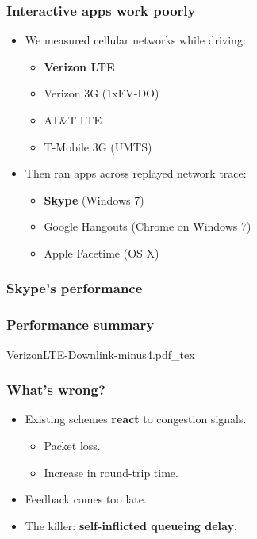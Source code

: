 \documentclass[svgnames]{beamer}
\begin{document}
\begin{frame}
\frametitle{Interactive apps work poorly}

\begin{itemize}
\item We measured cellular networks while driving:

\begin{itemize}
\item {\color{red}\bf Verizon LTE}
\item Verizon 3G (1xEV-DO)
\item AT\&T LTE
\item T-Mobile 3G (UMTS)
\end{itemize}

\item Then ran apps across replayed network trace:

\begin{itemize}
\item {\color{red}\bf Skype} (Windows 7)
\item Google Hangouts (Chrome on Windows 7)
\item Apple Facetime (OS X)
\end{itemize}

\end{itemize}

\end{frame}

\begin{frame}
\frametitle{Skype's performance}

\end{frame}

\begin{frame}
\frametitle{Performance summary}

{
\def\svgwidth{\columnwidth}\footnotesize{VerizonLTE-Downlink-minus4.pdf_tex}
}
\end{frame}

\begin{frame}
\frametitle{What's wrong?}

\begin{itemize}
\item Existing schemes \textbf{react} to congestion signals.

\begin{itemize}
\item Packet loss.
\item Increase in round-trip time.
\end{itemize}

\item Feedback comes too late.

\item The killer: \textbf{self-inflicted queueing delay}.

\end{itemize}

\end{frame}
\end{document}
